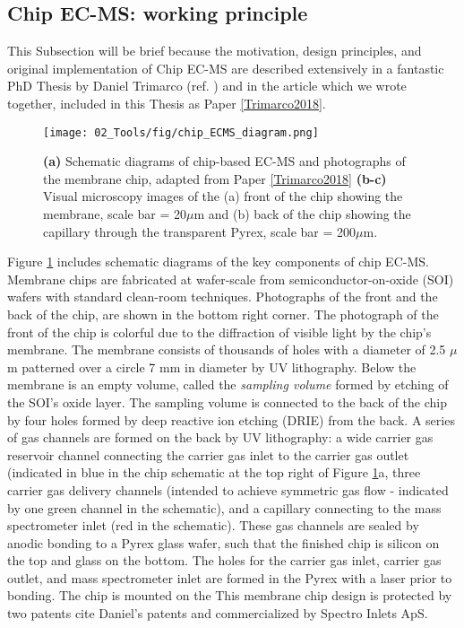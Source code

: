 \subsection{Chip EC-MS: working principle}\label{subsec:ECMS}

This Subsection will be brief because the motivation, design principles, and original implementation of Chip EC-MS are described extensively in a fantastic PhD Thesis by Daniel Trimarco (ref. \cite{Trimarco2017_PhD}) and in the article which we wrote together, included in this Thesis as Paper \ref{Trimarco2018}. 


\begin{figure}[h!]
	\centering
	\texttt{[image: 02\_Tools/fig/chip\_ECMS\_diagram.png]}
	\caption{\textbf{(a)} Schematic diagrams of chip-based EC-MS and photographs of the membrane chip, adapted from Paper \ref{Trimarco2018} \textbf{(b-c)} Visual microscopy images of the (a) front of the chip showing the membrane, scale bar = 20$\mu$m and (b) back of the chip showing the capillary through the transparent Pyrex, scale bar = 200$\mu$m.}
	\label{fig:chipECMS}
\end{figure}

Figure \ref{fig:chipECMS} includes schematic diagrams of the key components of chip EC-MS. Membrane chips are fabricated at wafer-scale from semiconductor-on-oxide (SOI) wafers with standard clean-room techniques. Photographs of the front and the back of the chip, are shown in the bottom right corner. The photograph of the front of the chip is colorful due to the diffraction of visible light by the chip's membrane. The membrane consists of thousands of holes with a diameter of 2.5 $\mu$m patterned over a circle 7 mm in diameter by UV lithography. Below the membrane is an empty volume, called the \textit{sampling volume} formed by etching of the SOI's oxide layer. The sampling volume is connected to the back of the chip by four holes formed by deep reactive ion etching (DRIE) from the back. A series of gas channels are formed on the back by UV lithography: a wide carrier gas reservoir channel connecting the carrier gas inlet to the carrier gas outlet (indicated in blue in the chip schematic at the top right of Figure \ref{fig:chipECMS}a, three carrier gas delivery channels (intended to achieve symmetric gas flow - indicated by one green channel in the schematic), and a capillary connecting to the mass spectrometer inlet (red in the schematic). These gas channels are sealed by anodic bonding to a Pyrex glass wafer, such that the finished chip is silicon on the top and glass on the bottom. The holes for the carrier gas inlet, carrier gas outlet, and mass spectrometer inlet are formed in the Pyrex with a  laser prior to bonding. The chip is mounted on the This membrane chip design is protected by two patents {\todo cite Daniel's patents} and commercialized by Spectro Inlets ApS.

